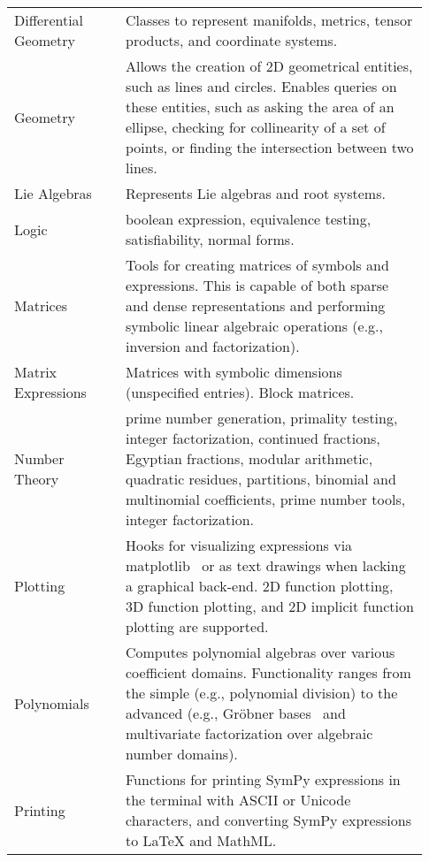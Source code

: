 \begin{longtable}[htbc]{p{0.25\linewidth}p{0.68\linewidth}}
Differential Geometry & Classes to represent manifolds, metrics, tensor
products, and coordinate systems.\\

Geometry & Allows the creation of 2D geometrical entities, such as lines and
circles. Enables queries on these entities, such as asking the area of an
ellipse, checking for collinearity of a set of
points, or finding the intersection between two lines.\\

Lie Algebras & Represents Lie algebras and root systems.\\

Logic & boolean expression, equivalence testing, satisfiability, normal
forms.\\

Matrices & Tools for creating matrices of symbols and expressions. This is
capable of both sparse and dense representations and performing
symbolic linear algebraic operations (e.g., inversion and factorization).\\

Matrix Expressions & Matrices with symbolic dimensions (unspecified entries).
Block matrices.\\

Number Theory & prime number generation, primality testing, integer
factorization, continued fractions, Egyptian fractions, modular arithmetic,
quadratic residues, partitions, binomial and multinomial coefficients,
prime number tools, integer factorization. \\

Plotting & Hooks for visualizing expressions via matplotlib~\cite{Hunter:2007}
or as text drawings when lacking a graphical back-end. 2D function plotting,
3D function
plotting, and 2D implicit function plotting are supported.\\

Polynomials & Computes polynomial algebras over various coefficient domains.
Functionality ranges from the simple (e.g., polynomial division) to the
advanced (e.g., Gr\"obner bases~\cite{adams1994introduction} and multivariate
factorization over algebraic number domains).\\

Printing & Functions for printing SymPy expressions in the terminal with ASCII
or Unicode characters, and converting SymPy expressions to \LaTeX{} and
MathML.\\


\end{longtable}
